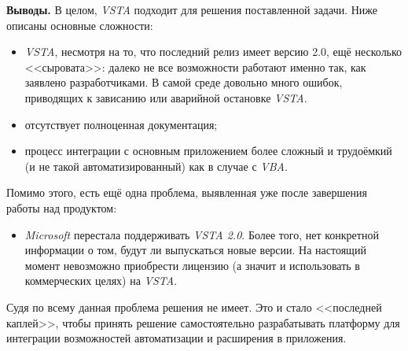 {\bf Выводы.} В целом, {\it VSTA} подходит для решения поставленной задачи. Ниже описаны основные сложности:
\begin{itemize}
\item {\it VSTA}, несмотря на то, что последний релиз имеет версию 2.0, ещё несколько <<сыровата>>: далеко не все возможности работают именно так, как заявлено разработчиками. В самой среде довольно много ошибок, приводящих к зависанию или аварийной остановке {\it VSTA}.
\item отсутствует полноценная документация;
\item процесс интеграции с основным приложением более сложный и трудоёмкий (и не такой автоматизированный) как в случае с {\it VBA}.
\end{itemize}

Помимо этого, есть ещё одна проблема, выявленная уже после завершения работы над продуктом:
\begin{itemize}
\item {\it Microsoft} перестала поддерживать {\it VSTA 2.0}. Более того, нет конкретной информации о том, будут ли выпускаться новые версии. На настоящий момент невозможно приобрести лицензию (а значит и использовать в коммерческих целях) на {\it VSTA}.
\end{itemize}
Судя по всему данная проблема решения не имеет. Это и стало <<последней каплей>>, чтобы принять решение самостоятельно разрабатывать платформу для интеграции возможностей автоматизации и расширения в приложения.